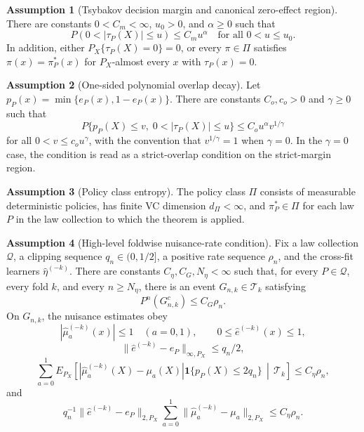 \documentclass[11pt]{article}
\newcommand{\one}{\mathbf{1}}
\theoremstyle{definition}
\newtheorem{assumption}{Assumption}
\theoremstyle{plain}
\theoremstyle{remark}
\begin{document}
\begin{assumption}[Tsybakov decision margin and canonical zero-effect region]\label{ass:margin}
There are constants \(0<C_m<\infty\), \(u_0>0\), and \(\alpha\ge0\) such that
\[
P(0<|\tau_P(X)|\le u)\le C_m u^\alpha
\quad\text{for all }0<u\le u_0.
\]
In addition, either \(P_X\{\tau_P(X)=0\}=0\), or every
\(\pi\in\Pi\) satisfies \(\pi(x)=\pi_P^*(x)\) for \(P_X\)-almost every
\(x\) with \(\tau_P(x)=0\).
\end{assumption}

\begin{assumption}[One-sided polynomial overlap decay]\label{ass:overlap-decay}
Let \(p_P(x)=\min\{e_P(x),1-e_P(x)\}\).  There are constants
\(C_o,c_o>0\) and \(\gamma\ge0\) such that
\[
P\{p_P(X)\le v,\;0<|\tau_P(X)|\le u\}
  \le C_o u^\alpha v^{1/\gamma}
\]
for all \(0<v\le c_o u^\gamma\), with the convention that \(v^{1/\gamma}=1\)
when \(\gamma=0\).  In the \(\gamma=0\) case, the condition is read as a
strict-overlap condition on the strict-margin region.
\end{assumption}

\begin{assumption}[Policy class entropy]\label{ass:policy-class}
The policy class \(\Pi\) consists of measurable deterministic policies, has
finite VC dimension \(d_\Pi<\infty\), and \(\pi_P^*\in\Pi\) for each law
\(P\) in the law collection to which the theorem is applied.
\end{assumption}

\begin{assumption}[High-level foldwise nuisance-rate condition]\label{ass:nuisance}
Fix a law collection \(\mathcal Q\), a clipping sequence \(q_n\in(0,1/2]\),
a positive rate sequence \(\rho_n\), and the cross-fit learners
\(\widehat\eta^{(-k)}\).  There are constants
\(C_\eta,C_G,N_\eta<\infty\) such that, for every \(P\in\mathcal Q\), every
fold \(k\), and every \(n\ge N_\eta\), there is an event
\(G_{n,k}\in\mathcal T_k\) satisfying
\[
P^n(G_{n,k}^c)\le C_G\rho_n.
\]
On \(G_{n,k}\), the nuisance estimates obey
\[
|\widehat\mu_a^{(-k)}(x)|\le1\quad(a=0,1),\qquad
0\le\widehat e^{(-k)}(x)\le1,
\]
\[
\|\widehat e^{(-k)}-e_P\|_{\infty,P_X}\le q_n/2,
\]
\[
\sum_{a=0}^1
E_{P_X}\!\left[
|\widehat\mu_a^{(-k)}(X)-\mu_a(X)|
\one\{p_P(X)\le2q_n\}
\,\middle|\,\mathcal T_k\right]
\le C_\eta\rho_n,
\]
and
\[
q_n^{-1}
\|\widehat e^{(-k)}-e_P\|_{2,P_X}
\sum_{a=0}^1
\|\widehat\mu_a^{(-k)}-\mu_a\|_{2,P_X}
\le C_\eta\rho_n.
\]
\end{assumption}
\end{document}
